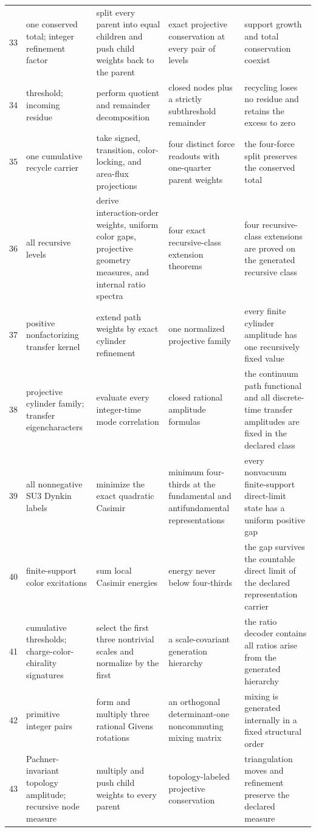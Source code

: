 \documentclass[11pt]{article}
\numberwithin{equation}{section}
\theoremstyle{remark}
\begin{document}
\begin{landscape}
\begin{longtable}{p{0.65cm}p{3.5cm}p{4.0cm}p{4.0cm}p{4.6cm}}
33&one conserved total; integer refinement factor&split every parent into equal children and push child weights back to the parent&exact projective conservation at every pair of levels&support growth and total conservation coexist\\
34&threshold; incoming residue&perform quotient and remainder decomposition&closed nodes plus a strictly subthreshold remainder&recycling loses no residue and retains the excess to zero\\
35&one cumulative recycle carrier&take signed, transition, color-locking, and area-flux projections&four distinct force readouts with one-quarter parent weights&the four-force split preserves the conserved total\\
36&all recursive levels&derive interaction-order weights, uniform color gaps, projective geometry measures, and internal ratio spectra&four exact recursive-class extension theorems&four recursive-class extensions are proved on the generated recursive class\\
37&positive nonfactorizing transfer kernel&extend path weights by exact cylinder refinement&one normalized projective family&every finite cylinder amplitude has one recursively fixed value\\
38&projective cylinder family; transfer eigencharacters&evaluate every integer-time mode correlation&closed rational amplitude formulas&the continuum path functional and all discrete-time transfer amplitudes are fixed in the declared class\\
39&all nonnegative SU3 Dynkin labels&minimize the exact quadratic Casimir&minimum four-thirds at the fundamental and antifundamental representations&every nonvacuum finite-support direct-limit state has a uniform positive gap\\
40&finite-support color excitations&sum local Casimir energies&energy never below four-thirds&the gap survives the countable direct limit of the declared representation carrier\\
41&cumulative thresholds; charge-color-chirality signatures&select the first three nontrivial scales and normalize by the first&a scale-covariant generation hierarchy&the ratio decoder contains all ratios arise from the generated hierarchy\\
42&primitive integer pairs&form and multiply three rational Givens rotations&an orthogonal determinant-one noncommuting mixing matrix&mixing is generated internally in a fixed structural order\\
43&Pachner-invariant topology amplitude; recursive node measure&multiply and push child weights to every parent&topology-labeled projective conservation&triangulation moves and refinement preserve the declared measure\\

\end{longtable}
\end{landscape}
\end{document}
